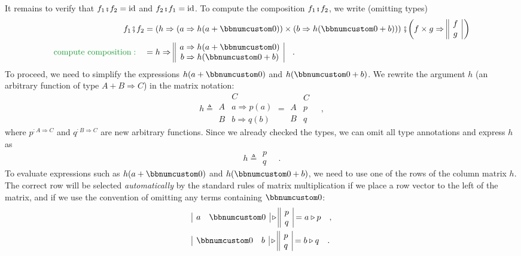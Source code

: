 It remains to verify that $f_{1}\bef f_{2}=\text{id}$ and $f_{2}\bef f_{1}=\text{id}$.
To compute the composition $f_{1}\bef f_{2}$, we write (omitting
types)
\begin{align*}
f_{1}\bef f_{2} & =\left(h\Rightarrow(a\Rightarrow h(a+\bbnum 0))\times(b\Rightarrow h(\bbnum 0+b))\right)\bef\bigg(f\times g\Rightarrow\begin{array}{||c|}
f\\
g
\end{array}\,\bigg)\\
{\color{greenunder}\text{compute composition}:}\quad & =h\Rightarrow\begin{array}{||c|}
a\Rightarrow h(a+\bbnum 0)\\
b\Rightarrow h(\bbnum 0+b)
\end{array}\quad.
\end{align*}
To proceed, we need to simplify the expressions $h(a+\bbnum 0)$ and
$h(\bbnum 0+b)$. We rewrite the argument $h$ (an arbitrary function
of type $A+B\Rightarrow C$) in the matrix notation:
\[
h\triangleq\begin{array}{|c||c|}
 & C\\
\hline A & a\Rightarrow p(a)\\
B & b\Rightarrow q(b)
\end{array}=\begin{array}{|c||c|}
 & C\\
\hline A & p\\
B & q
\end{array}\quad,
\]
where $p^{:A\Rightarrow C}$ and $q^{:B\Rightarrow C}$ are new arbitrary
functions. Since we already checked the types, we can omit all type
annotations and express $h$ as
\[
h\triangleq\begin{array}{||c|}
p\\
q
\end{array}\quad.
\]
To evaluate expressions such as $h(a+\bbnum 0)$ and $h(\bbnum 0+b)$,
we need to use one of the rows of the column matrix $h$. The correct
row will be selected \emph{automatically} by the standard rules of
matrix multiplication if we place a row vector to the left of the
matrix, and if we use the convention of omitting any terms containing
$\bbnum 0$:
\begin{align*}
 & \begin{array}{|cc|}
a & \bbnum 0\end{array}\triangleright\begin{array}{||c|}
p\\
q
\end{array}=a\triangleright p\quad,\\
 & \begin{array}{|cc|}
\bbnum 0 & b\end{array}\triangleright\begin{array}{||c|}
p\\
q
\end{array}=b\triangleright q\quad.
\end{align*}
